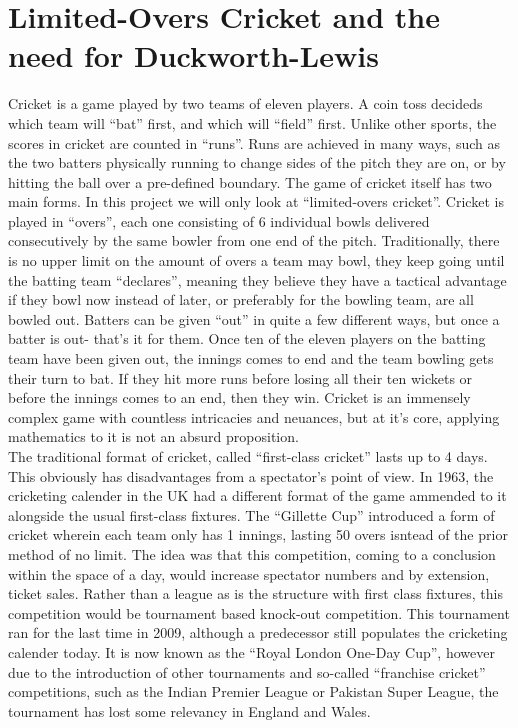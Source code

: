 \section{Limited-Overs Cricket and the need for Duckworth-Lewis}
Cricket is a game played by two teams of eleven players. A coin toss decideds which team will ``bat'' first, and which will ``field'' first. Unlike other sports, the scores in cricket are counted in ``runs''. Runs are achieved
in many ways, such as the two batters physically running to change sides of the pitch they are on, or by hitting the ball over a pre-defined boundary. The game of cricket itself has two main forms. In this project we will 
only look at ``limited-overs cricket''. Cricket is played in ``overs'', each one consisting of 6 individual bowls delivered consecutively by the same bowler from one end of the pitch. Traditionally, there is no upper limit on the 
amount of overs a team may bowl, they keep going until the batting team ``declares'', meaning they believe they have a tactical advantage if they bowl now instead of later, or preferably for the bowling team, are all bowled out. 
Batters can be given ``out'' in quite a few different ways, but once a batter is out- that's it for them. Once ten of the eleven players on the batting team have been given out, the innings comes to end and the team bowling 
gets their turn to bat. If they hit more runs before losing all their ten wickets or before the innings comes to an end, then they win. Cricket is an immensely complex game with countless intricacies and neuances, but at 
it's core, applying mathematics to it is not an absurd proposition. \\

The traditional format of cricket, called ``first-class cricket'' lasts up to 4 days. This obviously has disadvantages from a spectator's point of view. 
In 1963, the cricketing calender in the UK had a different format of the game ammended to it alongside the usual first-class fixtures.
The ``Gillette Cup'' introduced a form of cricket wherein each team only has 1 innings, lasting 50 overs isntead of the prior method of no limit. The idea was 
that this competition, coming to a conclusion within the space of a day, would increase spectator numbers and by extension, ticket sales.  Rather than a league 
as is the structure with first class fixtures, this competition would be tournament based knock-out competition. This tournament ran for the last time in 2009, although 
a predecessor still populates the cricketing calender today. It is now known as the ``Royal London One-Day Cup'', however due to the introduction of other tournaments 
and so-called ``franchise cricket'' competitions, such as the Indian Premier League or Pakistan Super League,  the tournament has lost some relevancy in England and Wales. \\

